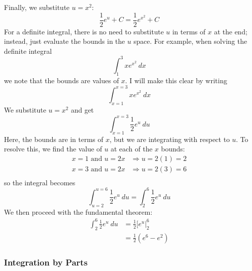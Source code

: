 Finally, we substitute $u = x^2$:
\begin{equation*}
    \frac{1}{2} e^u + C = \frac{1}{2} e^{x^2} + C
\end{equation*}
For a definite integral, there is no need to substitute $u$ in terms of $x$ at the end; instead, just evaluate the bounds in the $u$ space. 
For example, when solving the definite integral
\begin{equation*}
    \int_1^3 x e^{x^2}\ dx
\end{equation*}
we note that the bounds are values of $x$. I will make this clear by writing
\begin{equation*}
    \int_{x = 1}^{x = 3} x e^{x^2}\ dx
\end{equation*}
We substitute $u = x^2$ and get 
\begin{equation*}
    \int_{x = 1}^{x = 3} \frac{1}{2} e^u\ du
\end{equation*}
Here, the bounds are in terms of $x$, but we are integrating with respect to $u$. To resolve this, we find the value of $u$ at each of the $x$ bounds:
\begin{equation*}
    \begin{aligned}
        x = 1 \text{ and } u = 2 x & \Rightarrow u = 2(1) = 2 \\ 
        x = 3 \text{ and } u = 2 x & \Rightarrow u = 2(3) = 6 \\ 
    \end{aligned}
\end{equation*}
so the integral becomes
\begin{equation*}
    \int_{u = 2}^{u = 6} \frac{1}{2} e^u\ du = \int_2^6 \frac{1}{2} e^u\ du
\end{equation*}
We then proceed with the fundamental theorem:
\begin{equation*}
    \begin{aligned}
        \int_2^6 \frac{1}{2} e^u\ du & = \frac{1}{2} \Big[e^u\Big|_2^6 \\ 
        & \boxed{= \frac{1}{2} (e^6 - e^2)}
    \end{aligned}
\end{equation*}

\subsubsection{Integration by Parts}

